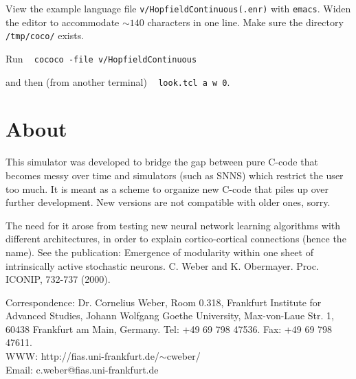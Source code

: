 \documentclass[12pt]{article}
\begin{document}
 View the example language file \texttt{v/HopfieldContinuous(.enr)} with \texttt{emacs}.
 Widen the editor to accommodate $\sim \! 140$ characters in one line.
Make sure the directory \texttt{/tmp/coco/} exists.

 Run ~
 \texttt{cococo -file v/HopfieldContinuous}

 and then (from another terminal) ~
 \texttt{look.tcl a w 0}.



\section{About}

This simulator was developed to bridge the gap between pure C-code that becomes messy over time and simulators (such as SNNS) which restrict the user too much. It is meant as a scheme to organize new C-code that piles up over further development. New versions are not compatible with older ones, sorry.

The need for it arose from testing new neural network learning algorithms with different architectures, in order to explain cortico-cortical connections (hence the name). See the publication: Emergence of modularity within one sheet of intrinsically active stochastic neurons. C. Weber and K. Obermayer. Proc. ICONIP, 732-737 (2000).

Correspondence:
Dr. Cornelius Weber,
Room 0.318,
Frankfurt Institute for Advanced Studies,
Johann Wolfgang Goethe University,
Max-von-Laue Str. 1,
60438 Frankfurt am Main,
Germany.
Tel: +49 69 798 47536.
Fax: +49 69 798 47611.\\
WWW: http://fias.uni-frankfurt.de/$\sim$cweber/\\
Email: c.weber@fias.uni-frankfurt.de
\end{document}
